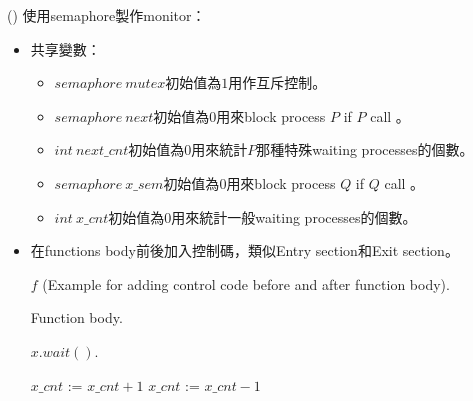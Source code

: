 \begin{theorem}{()} 使用semaphore製作monitor：\begin{itemize}
        \item 共享變數：\begin{itemize}
            \item $semaphore \ mutex$初始值為$1$用作互斥控制。
            \item $semaphore \ next$初始值為$0$用來block process $P$ if $P$ call 。
            \item $int \ next\_cnt$初始值為$0$用來統計$P$那種特殊waiting processes的個數。
            \item $semaphore \ x\_sem$初始值為$0$用來block process $Q$ if $Q$ call 。
            \item $int \ x\_cnt$初始值為$0$用來統計一般waiting processes的個數。
        \end{itemize}
        \item 在functions body前後加入控制碼，類似Entry section和Exit section。
        \begin{algorithm}[H]
            \caption{$f$ (Example for adding control code before and after function body).}
            \begin{algorithmic}[1]
                    \State {}
                    \State Function body.
                        \State {}
                    \Else
                        \State {}
                    \EndIf
                \EndFunction
            \end{algorithmic}
        \end{algorithm}
        \begin{algorithm}[H]
            \caption{$x.wait()$.}
            \begin{algorithmic}[1]
                    \State $x\_cnt$ := $x\_cnt + 1$
                        \State {}
                    \Else
                        \State {}
                    \EndIf
                    \State {} 
                    \State $x\_cnt$ := $x\_cnt - 1$ 
                \EndFunction
            \end{algorithmic}
        \end{algorithm}
        \begin{algorithm}[H]

\end{algorithm}
\end{itemize}
\end{theorem}
